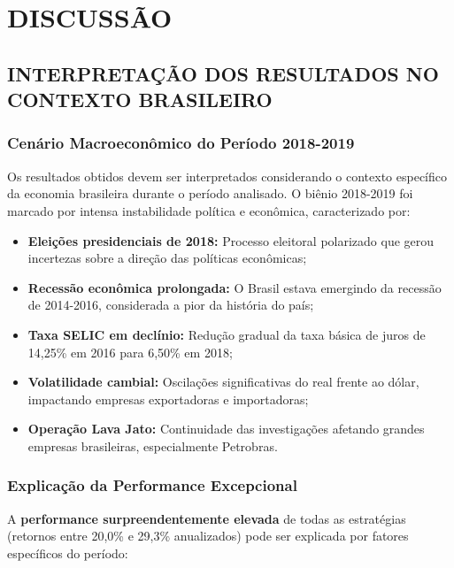 
\chapter{DISCUSSÃO}

\section{INTERPRETAÇÃO DOS RESULTADOS NO CONTEXTO BRASILEIRO}

\subsection{Cenário Macroeconômico do Período 2018-2019}

Os resultados obtidos devem ser interpretados considerando o contexto específico da economia brasileira durante o período analisado. O biênio 2018-2019 foi marcado por intensa instabilidade política e econômica, caracterizado por:

\begin{itemize}
    \item \textbf{Eleições presidenciais de 2018:} Processo eleitoral polarizado que gerou incertezas sobre a direção das políticas econômicas;
    \item \textbf{Recessão econômica prolongada:} O Brasil estava emergindo da recessão de 2014-2016, considerada a pior da história do país;
    \item \textbf{Taxa SELIC em declínio:} Redução gradual da taxa básica de juros de 14,25\% em 2016 para 6,50\% em 2018;
    \item \textbf{Volatilidade cambial:} Oscilações significativas do real frente ao dólar, impactando empresas exportadoras e importadoras;
    \item \textbf{Operação Lava Jato:} Continuidade das investigações afetando grandes empresas brasileiras, especialmente Petrobras.
\end{itemize}

\subsection{Explicação da Performance Excepcional}

A \textbf{performance surpreendentemente elevada} de todas as estratégias (retornos entre 20,0\% e 29,3\% anualizados) pode ser explicada por fatores específicos do período:

